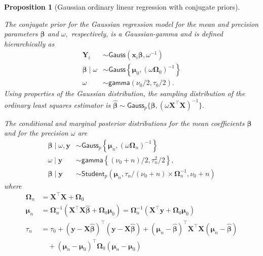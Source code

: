 \documentclass[
  11pt,
  letterpaper,
]{scrbook}
\theoremstyle{definition}
\theoremstyle{plain}
\newtheorem{proposition}{Proposition}[chapter]
\theoremstyle{plain}
\theoremstyle{plain}
\theoremstyle{definition}
\theoremstyle{definition}
\theoremstyle{plain}
\newtheorem{proposition}{Proposition}[chapter]
\theoremstyle{plain}
\theoremstyle{remark}
\begin{document}
\begin{proposition}[Gaussian ordinary linear regression with conjugate
priors]\protect\hypertarget{prp-gaussian-ols}{}\label{prp-gaussian-ols}

The conjugate prior for the Gaussian regression model for the mean and
precision parameters \(\boldsymbol{\beta}\) and \(\omega,\)
respectively, is a Gaussian-gamma and is defined hierarchically as
\begin{align*}
\boldsymbol{Y}_i &\sim \mathsf{Gauss}(\mathbf{x}_i\boldsymbol{\beta}, \omega^{-1}) \\
\boldsymbol{\beta} \mid \omega &\sim \mathsf{Gauss}\left\{\boldsymbol{\mu}_0, (\omega\boldsymbol{\Omega}_0)^{-1}\right\} \\
\omega &\sim \mathsf{gamma}(\nu_0/2,\tau_0/2).
\end{align*} Using properties of the Gaussian distribution, the sampling
distribution of the ordinary least squares estimator is
\(\widehat{\boldsymbol{\beta}} \sim \mathsf{Gauss}_p\{\boldsymbol{\beta}, (\omega\mathbf{X}^\top\mathbf{X})^{-1}\}.\)

The conditional and marginal posterior distributions for the mean
coefficients \(\boldsymbol{\beta}\) and for the precision \(\omega\) are
\begin{align*}
\boldsymbol{\beta} \mid \omega, \boldsymbol{y} &\sim \mathsf{Gauss}_p\left\{\boldsymbol{\mu}_n, (\omega\boldsymbol{\Omega}_n)^{-1}\right\}  \\
\omega \mid  \boldsymbol{y} &\sim \mathsf{gamma}\left\{(\nu_0 + n)/2,  \tau^2_n/2\right\}, \\
\boldsymbol{\beta} \mid  \boldsymbol{y} &\sim \mathsf{Student}_p(\boldsymbol{\mu}_n,  \tau_n/(\nu_0+n) \times \mathbf{\Omega}_n^{-1}, \nu_0 + n)
\end{align*} where \begin{align*}
\boldsymbol{\Omega}_n &= \mathbf{X}^\top\mathbf{X} + \boldsymbol{\Omega}_0\\
\boldsymbol{\mu}_n &= \boldsymbol{\Omega}_n^{-1}(\mathbf{X}^\top\mathbf{X}\widehat{\boldsymbol{\beta}} + \boldsymbol{\Omega}_0\boldsymbol{\mu}_0) = \boldsymbol{\Omega}_n^{-1}(\mathbf{X}^\top\boldsymbol{y} + \boldsymbol{\Omega}_0\boldsymbol{\mu}_0)\\
\tau_n &= \tau_0 + (\boldsymbol{y} - \mathbf{X}\widehat{\boldsymbol{\beta}})^\top(\boldsymbol{y} - \mathbf{X}\widehat{\boldsymbol{\beta}}) + (\boldsymbol{\mu}_n - \widehat{\boldsymbol{\beta}})^\top \mathbf{X}^\top\mathbf{X}(\boldsymbol{\mu}_n - \widehat{\boldsymbol{\beta}}) \\& \quad + (\boldsymbol{\mu}_n-\boldsymbol{\mu}_0)^\top\boldsymbol{\Omega}_0(\boldsymbol{\mu}_n-\boldsymbol{\mu}_0)
\end{align*}

\end{proposition}
\end{document}
